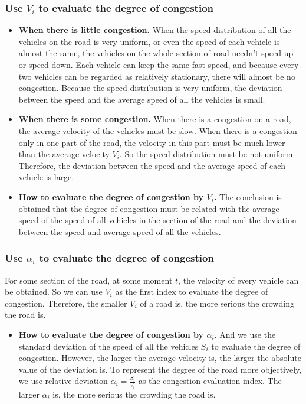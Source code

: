 \documentclass{mcmthesis}
\begin{document}
\subsubsection{Use $V_{i}$ to evaluate the degree of congestion}
\begin{itemize}
\item{\textbf{When there is little congestion.} \indent When the speed distribution of all the vehicles on the road is very uniform, or even the speed of each vehicle is almost the same, the vehicles on the whole section of road needn't speed up or speed down. Each vehicle can keep the same fast speed, and because every two vehicles can be regarded as relatively stationary, there will almost be no congestion. Because the speed distribution is very uniform, the deviation between the speed and the average speed of all the vehicles is small.}
\end{itemize}
\begin{itemize}
\item{\textbf{When there is some congestion.} When there is a congestion on a road, the average velocity of the vehicles must be slow. When there is a congestion only in one part of the road, the velocity in this part must be much lower than the average velocity $ V_{i} $. So the speed distribution must be not uniform. Therefore, the deviation between the speed and the average speed of each vehicle is large. }
\end{itemize}

\begin{itemize}
\item{\textbf{How to evaluate the degree of congestion by $V_{i}$.} The conclusion is obtained that the degree of congestion must be related with the average speed of the speed of all vehicles in the section of the road and the deviation between the speed and average speed of all the vehicles.}
\end{itemize}

\subsubsection{Use $\alpha_{i}$ to evaluate the degree of congestion}
\indent For some section of the road, at some moment $t$, the velocity of every vehicle can be obtained. So we can use $ V_{i} $ as the first index to evaluate the degree of congestion. Therefore, the smaller $V_{i}$ of a road is, the more serious the crowding the road is.

\begin{itemize}
\item{\textbf{How to evaluate the degree of congestion by $\alpha_{i}$}. And we use the standard deviation of the speed of all the vehicles $S_{i}$ to evaluate the degree of congestion. However, the larger the average velocity is, the larger the absolute value of the deviation is. To represent the degree of the road more objectively, we use relative deviation $\alpha_{i} =\frac{S_{i } }{V_{i}} $ as the congestion evaluation index. The larger $\alpha_{i}$ is, the more serious the crowding the road is.}
\end{itemize}
\end{document}
